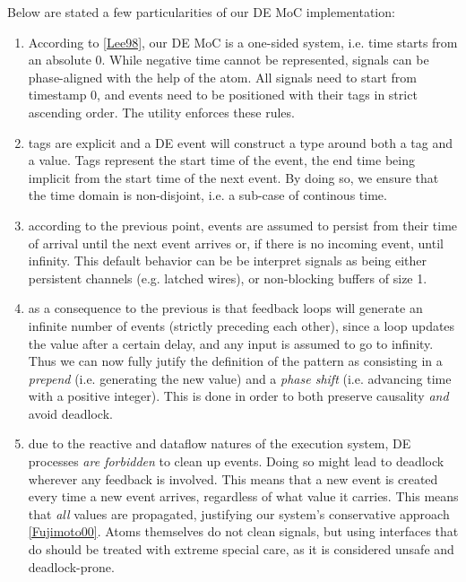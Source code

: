                  Below are stated a few particularities of our DE MoC
 implementation:\par
                 \begin{enumerate}
                 \item 
                 According to \href{ForSyDe-Atom.html#lee98}{[Lee98]}, our DE MoC is
 a one-sided system, i.e. time starts from an absolute 0. While
 negative time cannot be represented, signals can be phase-aligned
 with the help of the  atom. All signals
 need to start from timestamp 0, and events need to be positioned
 with their tags in strict ascending order. The 
 utility enforces these rules.\par
                 
                 \item 
                 tags are explicit and a DE event will construct a type around
 both a tag and a value. Tags represent the start time of the
 event, the end time being implicit from the start time of the
 next event. By doing so, we ensure that the time domain is
 non-disjoint, i.e. a sub-case of continous time. \par
                 
                 \item 
                 according to the previous point, events are assumed to persist
 from their time of arrival until the next event arrives or, if
 there is no incoming event, until infinity. This default behavior
 can be be interpret signals as being either persistent channels
 (e.g. latched wires), or non-blocking buffers of size 1.\par
                 
                 \item 
                 as a consequence to the previous is that feedback loops will
 generate an infinite number of events (strictly preceding each
 other), since a loop updates the value after a certain delay, and
 any input is assumed to go to infinity. Thus we can now fully
 jutify the definition of the  pattern as
 consisting in a \emph{prepend} (i.e. generating the new value) and a
 \emph{phase shift} (i.e. advancing time with a positive integer). This
 is done in order to both preserve causality \emph{and} avoid deadlock.\par
                 
                 \item 
                 due to the reactive and dataflow natures of the execution
 system, DE processes \emph{are forbidden} to clean up events. Doing so
 might lead to deadlock wherever any feedback is involved. This
 means that a new event is created every time a new event arrives,
 regardless of what value it carries. This means that \emph{all} values
 are propagated, justifying our system's conservative approach
 \href{ForSyDe-Atom.html#fuji00}{[Fujimoto00]}. Atoms themselves do not
 clean signals, but using interfaces that do should be treated
 with extreme special care, as it is considered unsafe and
 deadlock-prone.\par
                 

\end{enumerate}
